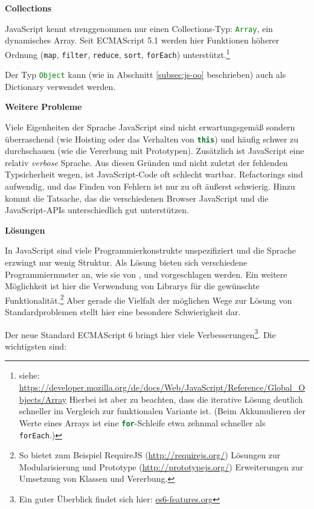 \documentclass[a4paper, 12pt, hidelinks, listof=totoc, listoftables=totoc, bibliography=totoc]{scrreprt}
\newcommand{\js}[1]{\lstinline[language=JavaScript, style=inline]|#1|}
\newcommand{\MyMiniSec}[1]{\rmfamily\fontsize{12}{15}\selectfont
	\vspace{7pt}\textbf{#1} %
}
\begin{document}
\MyMiniSec{Collections}

JavaScript kennt strenggenommen nur einen Collections-Typ: \js{Array}, ein dynamisches Array. Seit ECMAScript 5.1 werden hier Funktionen höherer Ordnung (\js{map}, \js{filter}, \js{reduce}, \js{sort}, \js{forEach}) unterstützt.\footnote{siehe: \url{https://developer.mozilla.org/de/docs/Web/JavaScript/Reference/Global_Objects/Array} Hierbei ist aber zu beachten, dass die iterative Lösung deutlich schneller im Vergleich zur funktionalen Variante ist. (Beim Akkumulieren der Werte eines Arrays ist eine \js{for}-Schleife etwa zehnmal schneller als \js{forEach}.)}

Der Typ \js{Object} kann (wie in Abschnitt \ref{subsec:js-oo} beschrieben) auch als Dictionary verwendet werden.


\MyMiniSec{Weitere Probleme}

Viele Eigenheiten der Sprache JavaScript sind nicht erwartungsgemäß sondern überraschend (wie Hoisting oder das Verhalten von \js{this}) und häufig schwer zu durchschauen (wie die Vererbung mit Prototypen). Zusätzlich ist JavaScript eine relativ \emph{verbose} Sprache. Aus diesen Gründen und nicht zuletzt der fehlenden Typsicherheit wegen, ist JavaScript-Code oft schlecht wartbar. Refactorings sind aufwendig, und das Finden von Fehlern ist nur zu oft äußerst schwierig. Hinzu kommt die Tatsache, das die verschiedenen Browser JavaScript und die JavaScript-\ac{API}s unterschiedlich gut unterstützen.


\MyMiniSec{Lösungen}

In JavaScript sind viele Programmierkonstrukte unspezifiziert und die Sprache erzwingt nur wenig Struktur. Als Lösung bieten sich verschiedene Programmiermuster an, wie sie von \cite{crockford2008.JSG}, \cite{stefanov2010.JSP} und \cite{flanagan2011.JDG} vorgeschlagen werden. Ein weitere Möglichkeit ist hier die Verwendung von Librarys für die gewünschte Funktionalität.\footnote{So bietet zum Beispiel RequireJS (\url{http://requirejs.org/}) Lösungen zur Modularisierung und  Prototype (\url{http://prototypejs.org/}) Erweiterungen zur Umsetzung von Klassen und Vererbung.} Aber gerade die Vielfalt der möglichen Wege zur Lösung von Standardproblemen stellt hier eine besondere Schwierigkeit dar.

Der neue Standard ECMAScript 6 bringt hier viele Verbesserungen\footnote{Ein guter Überblick findet sich hier: \url{es6-features.org}}. Die wichtigsten sind:
\end{document}
